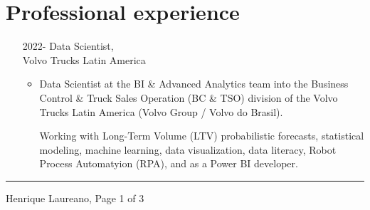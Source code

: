 \documentclass[12pt]{article}
\newcommand{\horrule}[1]{\noindent\rule{\linewidth}{#1}}
\begin{document}
\vspace{-0.5cm}
\section*{Professional experience}

\begin{itemize}
 \item[2022-] Data Scientist,\\
              Volvo Trucks Latin America
  \begin{itemize}
  \item Data Scientist at the BI \& Advanced Analytics team into the
        Business Control \& Truck Sales Operation (BC \& TSO) division
        of the Volvo Trucks Latin America (Volvo Group / Volvo do
        Brasil).
        
        Working with Long-Term Volume (LTV) probabilistic forecasts, statistical 
        modeling, machine learning, data visualization, data literacy, Robot 
        Process Automatyion (RPA), and as a Power BI developer.
  \end{itemize}
\end{itemize}

\vspace{\fill}
\horrule{1pt}
\noindent Henrique Laureano, \hfill Page 1 of 3
\end{document}
